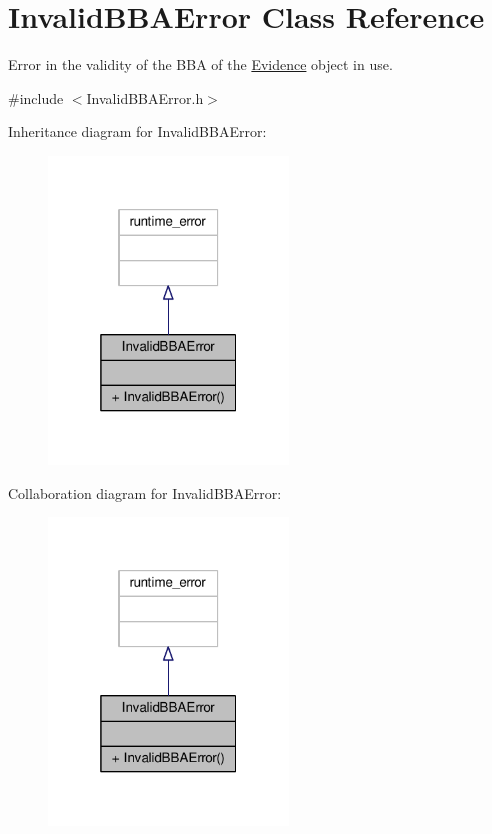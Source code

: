 \hypertarget{classInvalidBBAError}{}\section{Invalid\+B\+B\+A\+Error Class Reference}
\label{classInvalidBBAError}


Error in the validity of the B\+BA of the \hyperlink{classEvidence}{Evidence} object in use.  




{\ttfamily \#include $<$Invalid\+B\+B\+A\+Error.\+h$>$}



Inheritance diagram for Invalid\+B\+B\+A\+Error\+:\nopagebreak
\begin{figure}[H]
\begin{center}
\leavevmode
\includegraphics[width=181pt]{classInvalidBBAError__inherit__graph}
\end{center}
\end{figure}


Collaboration diagram for Invalid\+B\+B\+A\+Error\+:\nopagebreak
\begin{figure}[H]
\begin{center}
\leavevmode
\includegraphics[width=181pt]{classInvalidBBAError__coll__graph}
\end{center}
\end{figure}
